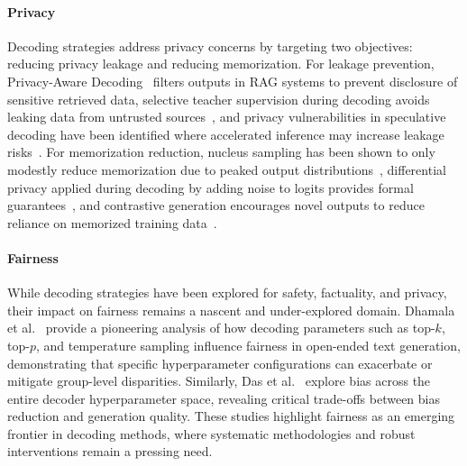 \paragraph{Privacy}

Decoding strategies address privacy concerns by targeting two objectives: reducing privacy leakage and reducing memorization. For leakage prevention, Privacy-Aware Decoding~\citep{Wang2025PrivacyAwareDM} filters outputs in RAG systems to prevent disclosure of sensitive retrieved data, selective teacher supervision during decoding avoids leaking data from untrusted sources~\citep{Ok2024DecodingWL}, and privacy vulnerabilities in speculative decoding have been identified where accelerated inference may increase leakage risks~\citep{Wei2024PrivacyRO}. For memorization reduction, nucleus sampling has been shown to only modestly reduce memorization due to peaked output distributions~\citep{Borec2024TheUI}, differential privacy applied during decoding by adding noise to logits provides formal guarantees~\citep{Majmudar2022DifferentiallyPD}, and contrastive generation encourages novel outputs to reduce reliance on memorized training data~\citep{Isonuma2024WhatsNI}.

\paragraph{Fairness}

While decoding strategies have been explored for safety, factuality, and privacy, their impact on fairness remains a nascent and under-explored domain. Dhamala et al.~\citep{Dhamala2022AnAO} provide a pioneering analysis of how decoding parameters such as top-$k$, top-$p$, and temperature sampling influence fairness in open-ended text generation, demonstrating that specific hyperparameter configurations can exacerbate or mitigate group-level disparities. Similarly, Das et al.~\citep{Das2022QuantifyingBF} explore bias across the entire decoder hyperparameter space, revealing critical trade-offs between bias reduction and generation quality. These studies highlight fairness as an emerging frontier in decoding methods, where systematic methodologies and robust interventions remain a pressing need.
